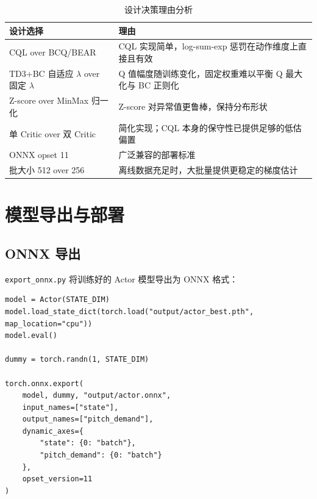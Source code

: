 \documentclass[11pt,a4paper]{ctexart}
\newcommand{\file}[1]{\texttt{#1}}
\begin{document}
\begin{table}[H]
\centering
\caption{设计决策理由分析}
\begin{tabular}{p{3.5cm}p{8.5cm}}
\toprule
\textbf{设计选择} & \textbf{理由} \\
\midrule
CQL over BCQ/BEAR & CQL 实现简单，log-sum-exp 惩罚在动作维度上直接且有效 \\

TD3+BC 自适应 $\lambda$ over 固定 $\lambda$ & Q 值幅度随训练变化，固定权重难以平衡 Q 最大化与 BC 正则化 \\

Z-score over MinMax 归一化 & Z-score 对异常值更鲁棒，保持分布形状 \\

单 Critic over 双 Critic & 简化实现；CQL 本身的保守性已提供足够的低估偏置 \\

ONNX opset 11 & 广泛兼容的部署标准 \\

批大小 512 over 256 & 离线数据充足时，大批量提供更稳定的梯度估计 \\
\bottomrule
\end{tabular}
\end{table}

\newpage

\section{模型导出与部署}

\subsection{ONNX 导出}

\file{export\_onnx.py} 将训练好的 Actor 模型导出为 ONNX 格式：

\begin{lstlisting}[caption={ONNX 导出流程}, label={lst:onnx}]
model = Actor(STATE_DIM)
model.load_state_dict(torch.load("output/actor_best.pth", map_location="cpu"))
model.eval()

dummy = torch.randn(1, STATE_DIM)

torch.onnx.export(
    model, dummy, "output/actor.onnx",
    input_names=["state"],
    output_names=["pitch_demand"],
    dynamic_axes={
        "state": {0: "batch"},
        "pitch_demand": {0: "batch"}
    },
    opset_version=11
)
\end{lstlisting}
\end{document}
